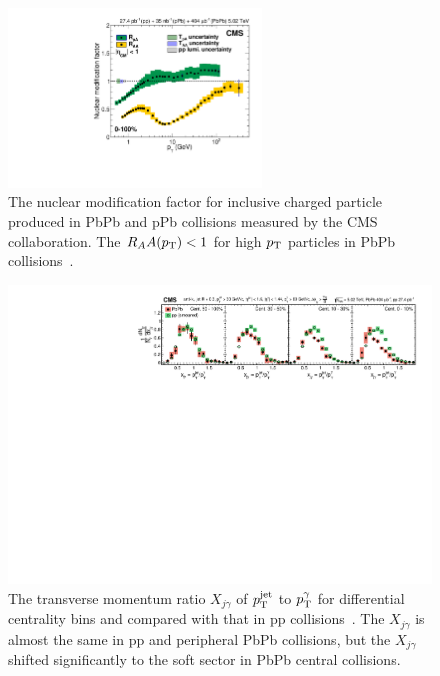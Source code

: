 \begin{figure}[ht]
  \begin{center}
    \includegraphics[width=0.6\textwidth]{figures/introduction/Charged_Particle_RAA.pdf}
  \end{center}
  \caption{The nuclear modification factor for inclusive charged particle produced in PbPb and pPb collisions measured by the CMS collaboration. The $R_AA(p_{\text{T}})<1$ for high $p_{\text{T}}$ particles in PbPb collisions~\cite{Khachatryan:2016odn}.}
  \label{fig:cms_charged_particle_Raa}
\end{figure}

\begin{figure}[ht]
  \begin{center}
    \includegraphics[width=\textwidth]{figures/introduction/CMS-HIN-16-002_Figure_006.pdf}
  \end{center}
  \caption{The transverse momentum ratio $X_{j\gamma}$ of $p_{\text{T}}^{\text{jet}}$ to $p_{\text{T}}^{\gamma}$ for differential centrality bins and compared with that in pp collisions~\cite{Sirunyan:2017qhf}. The $X_{j\gamma}$ is almost the same in pp and peripheral PbPb collisions, but the $X_{j\gamma}$ shifted significantly to the soft sector in PbPb central collisions.}
  \label{fig:cms_gamma_jet}
\end{figure}

